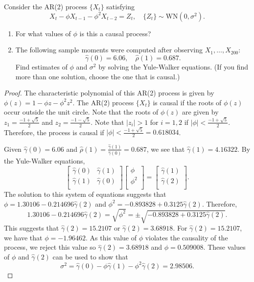 \documentclass[12pt]{article}
\theoremstyle{definition}
\newenvironment{custompbm}[1]
  {\renewcommand\theproblem{#1}\problem}
  {\endproblem}
\begin{document}
\begin{custompbm}{5.3}
  Consider the AR(2) process $\{X_t\}$ satisfying
  \[
    X_t - \phi X_{t-1} - \phi^2 X_{t-2} = Z_t, \quad \{Z_t\} \sim \text{WN}(0, \sigma^2).
  \]
  \begin{enumerate}
    \item For what values of $\phi$ is this a causal process?
    \item The following sample moments were computed after observing $X_1,\dots, X_{200}$:
      \[
        \hat{\gamma}(0) = 6.06, \quad \hat{\rho}(1) = 0.687.
      \]
      Find estimates of $\phi$ and $\sigma^2$ by solving the Yule-Walker equations. (If
      you find more than one solution, choose the one that is causal.)
  \end{enumerate}
\end{custompbm}

\begin{proof}
  The characteristic polynomial of this AR(2) process is given by $\phi(z) = 1 - \phi z - \phi^2 z^2$.
  The AR(2) process $\{X_t\}$ is causal if the roots of $\phi(z)$ occur outside the unit circle.
  Note that the roots of $\phi(z)$ are given by $z_1 = \frac{-1 + \sqrt{5}}{2}$
  and $z_2 = \frac{-1 - \sqrt{5}}{2}$. Note that $|z_i| > 1$ for $i=1,2$ if
  $|\phi| < \frac{-1 + \sqrt{5}}{2}$. Therefore, the process is causal if
  $|\phi| < \frac{-1 + \sqrt{5}}{2} = 0.618034$.

  Given $\hat{\gamma}(0) = 6.06$ and $\hat{\rho}(1) = \frac{\hat{\gamma}(1)}{\hat{\gamma}(0)} = 0.687$,
  we see that $\hat{\gamma}(1) = 4.16322$. By the Yule-Walker equations,
  \[
    \begin{bmatrix}
      \hat{\gamma}(0) & \hat{\gamma}(1) \\
      \hat{\gamma}(1) & \hat{\gamma}(0) \\
    \end{bmatrix}
    \begin{bmatrix}
      \phi \\
      \phi^2 \\
    \end{bmatrix}
    =
    \begin{bmatrix}
      \hat{\gamma}(1) \\
      \hat{\gamma}(2) \\
    \end{bmatrix}.
  \]
  The solution to this system of equations suggests that
  $\phi = 1.30106 - 0.214696 \hat{\gamma}(2)$ and $\phi^2 = -0.893828 + 0.3125\hat{\gamma}(2)$.
  Therefore,
  \[
    1.30106 - 0.214696 \hat{\gamma}(2) = \sqrt{\phi^2} = \pm \sqrt{-0.893828 + 0.3125\hat{\gamma}(2)}.
  \]
  This suggests that $\hat{\gamma}(2) = 15.2107$ or $\hat{\gamma}(2) = 3.68918$. For $\hat{\gamma}(2) = 15.2107$,
  we have that $\phi = -1.96462$. As this value of $\phi$ violates the causality of the process,
  we reject this value so $\hat{\gamma}(2) = 3.68918$ and $\phi = 0.509008$. These values of
  $\phi$ and $\hat{\gamma}(2)$ can be used to show that
  \[
    \sigma^2 = \hat{\gamma}(0) - \phi \hat{\gamma}(1) - \phi^2 \hat{\gamma}(2) = 2.98506.
  \]
\end{proof}
\end{document}
